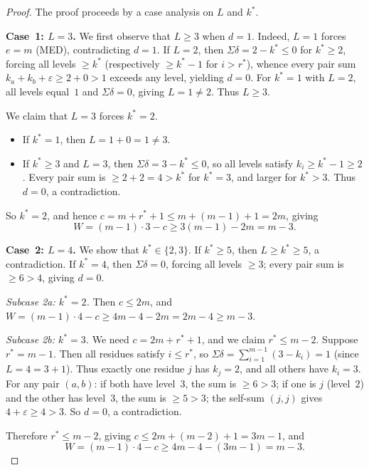 \documentclass[11pt]{amsart}
\theoremstyle{definition}
\theoremstyle{remark}
\begin{document}
\begin{proof}
The proof proceeds by a case analysis on $L$ and $k^*$.

\medskip
\noindent\textbf{Case~1: $L = 3$.}
We first observe that $L \ge 3$ when $d = 1$.
Indeed, $L = 1$ forces $e = m$ (MED), contradicting $d = 1$.
If $L = 2$, then $\Sigma\delta = 2 - k^* \le 0$ for $k^* \ge 2$, forcing all levels $\ge k^*$
(respectively $\ge k^* - 1$ for $i > r^*$), whence every pair sum
$k_a + k_b + \varepsilon \ge 2 + 0 > 1$ exceeds any level, yielding $d = 0$.
For $k^* = 1$ with $L = 2$, all levels equal~$1$ and $\Sigma\delta = 0$,
giving $L = 1 \neq 2$.  Thus $L \ge 3$.

We claim that $L = 3$ forces $k^* = 2$.
\begin{itemize}[nosep]
  \item If $k^* = 1$, then $L = 1 + 0 = 1 \neq 3$.
  \item If $k^* \ge 3$ and $L = 3$, then $\Sigma\delta = 3 - k^* \le 0$,
    so all levels satisfy $k_i \ge k^* - 1 \ge 2$.
    Every pair sum is $\ge 2 + 2 = 4 > k^*$ for $k^* = 3$, and larger for $k^* > 3$.
    Thus $d = 0$, a contradiction.
\end{itemize}
So $k^* = 2$, and hence $c = m + r^* + 1 \le m + (m-1) + 1 = 2m$, giving
\[
  W = (m - 1) \cdot 3 - c \ge 3(m - 1) - 2m = m - 3.
\]

\medskip
\noindent\textbf{Case~2: $L = 4$.}
We show that $k^* \in \{2, 3\}$.
If $k^* \ge 5$, then $L \ge k^* \ge 5$, a contradiction.
If $k^* = 4$, then $\Sigma\delta = 0$, forcing all levels $\ge 3$;
every pair sum is $\ge 6 > 4$, giving $d = 0$.

\smallskip
\textit{Subcase 2a: $k^* = 2$.}
Then $c \le 2m$, and $W = (m-1) \cdot 4 - c \ge 4m - 4 - 2m = 2m - 4 \ge m - 3$.

\smallskip
\textit{Subcase 2b: $k^* = 3$.}
We need $c = 2m + r^* + 1$, and we claim $r^* \le m - 2$.
Suppose $r^* = m - 1$.  Then all residues satisfy $i \le r^*$, so
$\Sigma\delta = \sum_{i=1}^{m-1}(3 - k_i) = 1$ (since $L = 4 = 3 + 1$).
Thus exactly one residue $j$ has $k_j = 2$, and all others have $k_i = 3$.
For any pair $(a, b)$: if both have level~$3$, the sum is $\ge 6 > 3$;
if one is $j$ (level~$2$) and the other has level~$3$,
the sum is $\ge 5 > 3$; the self-sum $(j, j)$ gives
$4 + \varepsilon \ge 4 > 3$.  So $d = 0$, a contradiction.

Therefore $r^* \le m - 2$, giving $c \le 2m + (m - 2) + 1 = 3m - 1$, and
\[
  W = (m - 1) \cdot 4 - c \ge 4m - 4 - (3m - 1) = m - 3.
\]


\end{proof}
\end{document}
